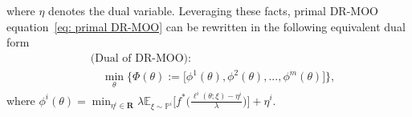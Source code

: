 \documentclass[twoside]{article} %
\def\eqref#1{equation~\ref{#1}}
\theoremstyle{plain}
\theoremstyle{definition}
\theoremstyle{remark}
\newcommand{\fL}{\mathcal{L}}
\begin{document}
where $\eta$ denotes the dual variable. Leveraging these facts, primal DR-MOO \eqref{eq: primal DR-MOO} can be rewritten in the following equivalent dual form
\begin{align}
  &\text{(Dual of DR-MOO):}\nonumber\\
  &\quad\min_{\theta} \Big\{ \Phi({\theta}) := \big[\phi^1({\theta}), \phi^2({\theta}), ..., \phi^m({\theta})\big] \Big\},
 \label{eq: dual DR-MOO}
\end{align}
where $\phi^i({\theta}) = \min_{\eta^i\in \mathbf{R}} \lambda \mathbb{E}_{\xi\sim\mathbb{P}^i}\big[f^*\big(\frac{\ell^i({\theta};\xi)-\eta^i}{\lambda}\big)\big]+\eta^i$.
\end{document}

